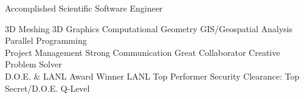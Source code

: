 \begin{headerbox}[boxrule=0.3mm]
{Accomplished Scientific Software Engineer}
\begin{center}
    3D Meshing \idot 3D Graphics \idot Computational Geometry \idot GIS/Geospatial Analysis \idot Parallel Programming \\
    Project Management \idot Strong Communication \idot Great Collaborator \idot Creative Problem Solver \\
    D.O.E. \& LANL Award Winner \idot LANL Top Performer \idot Security Clearance: Top Secret/D.O.E. Q-Level\\
\end{center}
\end{headerbox}
